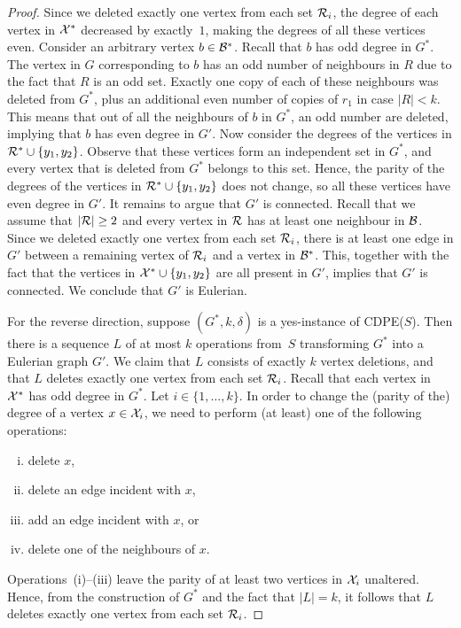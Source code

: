 \documentclass[11pt]{llncs}
\newcommand{\cdpe}{{\sc CDPE}}
\begin{document}
\begin{proof}
Since we deleted exactly one vertex from each set ${\cal R}_i$, the degree of
each vertex in ${\cal X}^*$ decreased by exactly~$1$, making the degrees of all
these vertices even. Consider an arbitrary vertex $b\in {\cal B}^*$. Recall
that $b$ has odd degree in $G^*$. The vertex in $G$ corresponding to $b$ has an
odd number of neighbours in $R$ due to the fact that $R$ is an odd set. Exactly
one copy of each of these neighbours was deleted from $G^*$, plus an additional
even number of copies of $r_1$ in case $|R|<k$. This means that out of all the
neighbours of $b$ in $G^*$, an odd number are deleted, implying that $b$ has
even degree in $G'$. Now consider the degrees of the vertices in ${\cal
R}^*\cup \{y_1,y_2\}$. Observe that these vertices form an independent set in
$G^*$, and every vertex that is deleted from $G^*$ belongs to this set. Hence,
the parity of the degrees of the vertices in ${\cal R}^*\cup \{y_1,y_2\}$ does
not change, so all these vertices have even degree in $G'$. It remains to argue
that $G'$ is connected. Recall that we assume that $|{\cal R}|\geq 2$ and every
vertex in ${\cal R}$ has at least one neighbour in ${\cal B}$. Since we deleted
exactly one vertex from each set ${\cal R}_i$, there is at least one edge in
$G'$ between a remaining vertex of ${\cal R}_i$ and a vertex in ${\cal B}^*$.
This, together with the fact that the vertices in ${\cal X}^*\cup \{y_1,y_2\}$
are all present in $G'$, implies that $G'$ is connected. We conclude that $G'$
is Eulerian.

\begin{sloppypar}
For the reverse direction, suppose $(G^*,k,\delta)$ is a yes-instance of
\cdpe($S$). Then there is a sequence $L$ of at most $k$ operations from~$S$
transforming $G^*$ into a Eulerian graph $G'$. We claim that $L$ consists of
exactly $k$ vertex deletions, and that $L$ deletes exactly one vertex from each
set ${\cal R}_i$. Recall that each vertex in~${\cal X}^*$ has odd degree in
$G^*$. 
Let $i\in \{1,\ldots,k\}$. In order to change the (parity of the) degree of a
vertex $x\in {\cal X}_i$, we need to perform (at least) one of the following operations:
\end{sloppypar}
\begin{enumerate}[(i)]
\renewcommand{\theenumi}{(\roman{enumi})}
\renewcommand\labelenumi{\theenumi}
\item delete $x$, 
\item delete an edge incident with $x$, 
\item add an edge incident with $x$, or 
\item delete one of the neighbours of $x$. 
\end{enumerate}
Operations~(i)--(iii) 
leave the parity of at least two vertices in ${\cal X}_i$ unaltered.
Hence, from the construction of $G^*$ and the fact that $|L|=k$, it follows
that $L$ deletes exactly one vertex from each set ${\cal R}_i$.


\end{proof}
\end{document}
